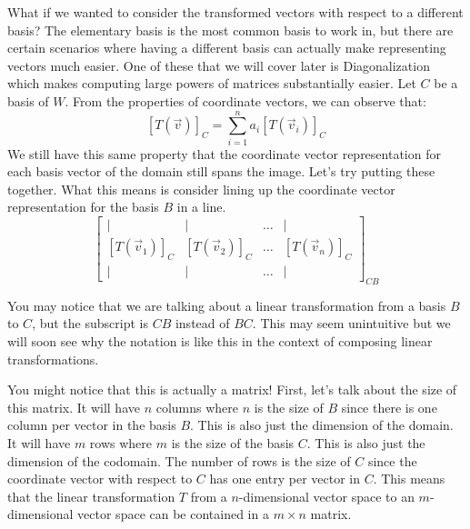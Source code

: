 What if we wanted to consider the transformed vectors with respect to a different basis? The elementary basis is the most common basis to work in, but there are certain scenarios where having a different basis can actually make representing vectors much easier. One of these that we will cover later is Diagonalization which makes computing large powers of matrices substantially easier. Let $C$ be a basis of $W$. From the properties of coordinate vectors, we can observe that:
$$[T(\vec{v})]_C=\sum_{i=1}^n a_i[T(\vec{v}_i)]_C$$
We still have this same property that the coordinate vector representation for each basis vector of the domain still spans the image. Let's try putting these together. What this means is consider lining up the coordinate vector representation for the basis $B$ in a line.
$$\begin{bmatrix}
    \vert & \vert & \ldots & \vert \\
    [T(\vec{v}_1)]_C & [T(\vec{v}_2)]_C & \ldots & [T(\vec{v}_n)]_C \\
    \vert & \vert & \ldots & \vert
\end{bmatrix}_{CB}$$
\begin{remark}
    You may notice that we are talking about a linear transformation from a basis $B$ to $C$, but the subscript is $CB$ instead of $BC$. This may seem unintuitive but we will soon see why the notation is like this in the context of composing linear transformations.
\end{remark}
You might notice that this is actually a matrix! First, let's talk about the size of this matrix. It will have $n$ columns where $n$ is the size of $B$ since there is one column per vector in the basis $B$. This is also just the dimension of the domain. It will have $m$ rows where $m$ is the size of the basis $C$. This is also just the dimension of the codomain. The number of rows is the size of $C$ since the coordinate vector with respect to $C$ has one entry per vector in $C$. This means that the linear transformation $T$ from a $n$-dimensional vector space to an $m$-dimensional vector space can be contained in a $m\times n$ matrix.

